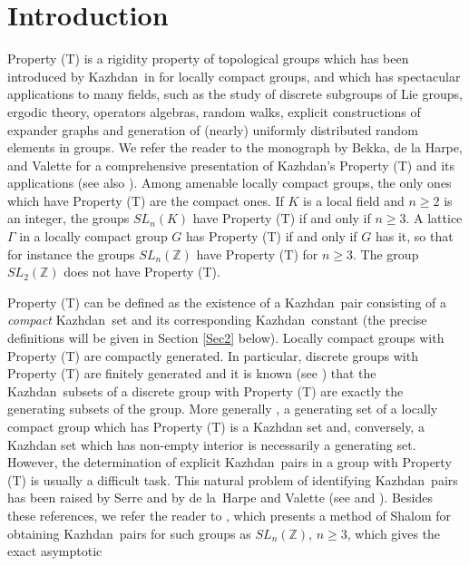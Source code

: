 \documentclass[11pt,english,a4paper]{smfart}
\numberwithin{equation}{section}
\theoremstyle{definition}
\begin{document}
\section{Introduction}\label{Section 0}
Property (T)  is a rigidity property of topological groups which has been
introduced by {Kazhdan}\ in \cite{K} for locally compact groups, and which has 
spectacular applications to many fields, such as  the study of discrete 
subgroups of Lie groups, ergodic theory, operators algebras, random walks, 
explicit constructions of expander graphs 
and generation of (nearly) uniformly distributed random elements in groups. 
We refer the reader to the monograph \cite{BdHV} by Bekka, de la Harpe, and Valette 
for a comprehensive presentation of Kazhdan's Property (T) and its applications (see also \cite{HarpeVal}). 
Among amenable locally compact groups, the only ones which have Property 
(T) are the compact ones. If $K$ is a local field and $n\ge 2$ is an integer, the groups $SL_{n}(K)$ 
have Property (T) if and only if $n\ge 3$. A 
lattice $\Gamma $ in a locally compact group $G$ has Property (T) if and 
only if $G$ has it, so that for instance the groups $SL_{n}({\ensuremath{\mathbb Z}})$ have 
Property (T) for $n\ge 3$. The group $SL_{2}({\ensuremath{\mathbb Z}})$ does not have Property (T).
\par\smallskip 
Property (T) can be defined as the existence of a {Kazhdan}\ pair consisting 
of a \emph{compact} {Kazhdan}\ set and its corresponding {Kazhdan}\ constant 
(the precise definitions will be given in Section \ref{Sec2} below). Locally compact groups with Property (T) 
are compactly generated. In particular, discrete groups with Property (T) are finitely generated 
and it is known (see \cite[Prop.~1.3.2]{BdHV}) that the {Kazhdan}\ 
 subsets of a discrete group with Property (T) are exactly the  generating subsets of the group. 
More generally \cite[Prop.~1.3.2]{BdHV}, a generating set of a locally compact group which has Property (T) is 
a Kazhdan set and, conversely, a Kazhdan set which has non-empty interior is necessarily a generating set.
However, the determination of explicit {Kazhdan}\ pairs in a group with Property (T) is usually a difficult 
task. This natural problem of identifying {Kazhdan}\ pairs has been raised by Serre and by de la~Harpe and Valette 
(see \cite{Burg} and \cite[p.~133]{HarpeVal}). Besides these references, 
we refer the reader to \cite[Ch.~4]{BdHV}, 
which presents a method of 
Shalom \cite{Sha2} for obtaining {Kazhdan}\ pairs for such groups as 
$SL_{n}({\ensuremath{\mathbb Z}})$, $n\ge 3$, \cite{Kass1} which gives the exact asymptotic 
\end{document}
